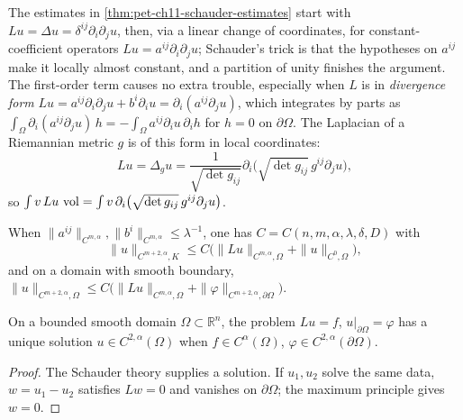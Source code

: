 \begin{remark}
  \label{rem:pet-ch11-divergence-form-laplace-beltrami}
  The estimates in \cref{thm:pet-ch11-schauder-estimates} start with
  $Lu=\Delta u=\delta^{ij}\partial_i\partial_ju$,
  then, via a linear change of coordinates, for constant-coefficient
  operators $Lu=a^{ij}\partial_i\partial_ju$; Schauder's trick is that the
  hypotheses on $a^{ij}$ make it locally almost constant, and a partition of
  unity finishes the argument. The first-order term causes no extra trouble,
  especially when $L$ is in \emph{divergence form}
  $Lu=a^{ij}\partial_i\partial_ju+b^i\partial_iu=\partial_i(a^{ij}\partial_ju)$,
  which integrates by parts as
  $\int_\Omega\partial_i(a^{ij}\partial_ju)\,h=-\int_\Omega a^{ij}\partial_iu\,\partial_ih$
  for $h=0$ on $\partial\Omega$. The Laplacian of a Riemannian metric $g$ is of
  this form in local coordinates:
  \[
    Lu=\Delta_gu=\frac1{\sqrt{\det g_{ij}}}\partial_i\big(\sqrt{\det g_{ij}}\,g^{ij}\partial_ju\big),
  \]
  so $\int v\,Lu\,\operatorname{vol}=\int v\,\partial_i\big(\sqrt{\det g_{ij}}\,g^{ij}\partial_ju\big)$.
\end{remark}

\begin{corollary}
  \label{cor:pet-ch11-higher-schauder-estimates}
  When $\|a^{ij}\|_{C^{m,\alpha}},\|b^i\|_{C^{m,\alpha}}\le\lambda^{-1}$,
  one has $C=C(n,m,\alpha,\lambda,\delta,D)$ with
  \[
    \|u\|_{C^{m+2,\alpha},K}\le C\big(\|Lu\|_{C^{m,\alpha},\Omega}+\|u\|_{C^0,\Omega}\big),
  \]
  and on a domain with smooth boundary,
  $\|u\|_{C^{m+2,\alpha},\Omega}\le C\big(\|Lu\|_{C^{m,\alpha},\Omega}+\|\varphi\|_{C^{m+2,\alpha},\partial\Omega}\big)$.
\end{corollary}

\begin{theorem}
  \label{thm:pet-ch11-dirichlet-problem-unique-solution}
  On a bounded smooth domain $\Omega\subset\mathbb{R}^n$, the problem
  $Lu=f$, $u|_{\partial\Omega}=\varphi$ has a unique
  solution $u\in C^{2,\alpha}(\Omega)$ when $f\in C^\alpha(\Omega)$,
  $\varphi\in C^{2,\alpha}(\partial\Omega)$.
\end{theorem}
\begin{proof}
  \sketch
  The Schauder theory supplies a solution. If \(u_1,u_2\) solve the same data, \(w=u_1-u_2\) satisfies \(Lw=0\) and vanishes on \(\partial\Omega\); the maximum principle gives \(w=0\).
\end{proof}


